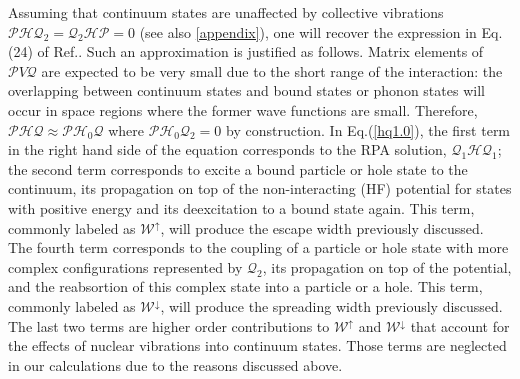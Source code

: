 \documentclass[12pt,a4paper,final]{iopart}
\begin{document}
Assuming that continuum states are unaffected by collective vibrations $\mathcal{P}\mathcal{H}\mathcal{Q}_2=\mathcal{Q}_2\mathcal{H}\mathcal{P}=0$ (see also \ref{appendix}), one will recover the expression in Eq.(24) of Ref.\cite{yoshida1983}. Such an approximation is justified as follows. Matrix elements of $\mathcal{P}V\mathcal{Q}$ are expected to be very small due to the short range of the interaction: the overlapping between continuum states and bound states or phonon states will occur in space regions where the former wave functions are small. Therefore, $\mathcal{P}\mathcal{H}\mathcal{Q}\approx \mathcal{P}\mathcal{H}_0\mathcal{Q}$ where $\mathcal{P}\mathcal{H}_0\mathcal{Q}_2=0$ by construction. In Eq.(\ref{hq1.0}), the first term in the right hand side of the equation corresponds to the RPA solution, $\mathcal{Q}_1\mathcal{H}\mathcal{Q}_1$; the second term corresponds to excite a bound particle or hole state to the continuum, its propagation on top of the non-interacting (HF) potential for states with positive energy and its deexcitation to a bound state again. This term, commonly labeled as $\mathcal{W}^\uparrow$, will produce the escape width previously discussed. The fourth term corresponds to the coupling of a particle or hole state with more complex configurations represented by $\mathcal{Q}_2$, its propagation on top of the potential, and the reabsortion of this complex state into a particle or a hole. This term, commonly labeled as $\mathcal{W}^\downarrow$, will produce the spreading width previously discussed. The last two terms are higher order contributions to $\mathcal{W}^\uparrow$ and $\mathcal{W}^\downarrow$ that account for the effects of nuclear vibrations into continuum states. Those terms are neglected in our calculations due to the reasons discussed above. 
\end{document}
